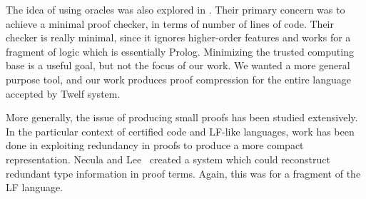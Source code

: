 \documentclass{acmconf}
\begin{document}
The idea of using oracles was also explored in
\cite{wu+:foundationalproofcheck}. Their primary concern was to
achieve a minimal proof checker, in terms of number of lines of
code. Their checker is really minimal, since it ignores higher-order
features and works for a fragment of logic which is essentially
Prolog.  Minimizing the trusted computing base is a useful goal, but
not the focus of our work. We wanted a more general purpose tool, and
our work produces proof compression for the entire language accepted
by Twelf system.

More generally, the issue of producing small proofs has been studied
extensively. In the particular context of certified code and LF-like
languages, work has been done in exploiting redundancy in proofs to
produce a more compact representation. Necula and Lee~\cite{necula+:lfi}
created a system which could reconstruct redundant type information in
proof terms. Again, this was for a fragment of the LF language.



\end{document}
